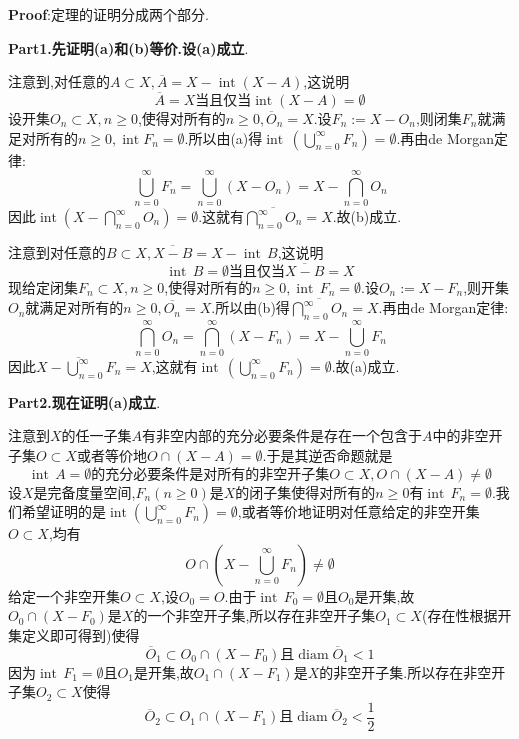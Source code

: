 \textbf{Proof}:定理的证明分成两个部分.\par
\textbf{Part1.先证明(a)和(b)等价.设(a)成立}.\par
注意到,对任意的$A\subset X,\overline{A}=X-\operatorname{int}(X-A)$,这说明
$$
\overline{A}=X\text{当且仅当}\operatorname{int}(X-A)=\emptyset
$$
设开集$O_n\subset X,n\geqslant 0$,使得对所有的$n\geqslant 0,\overline{O}_n=X$.设$F_n:=X-O_n$,则闭集$F_n$就满足对所有的$n\geqslant 0,\operatorname{int}F_n=\emptyset$.所以由(a)得$\operatorname{int}\,\left(\bigcup^{\infty}_{n=0}F_n\right)=\emptyset$.再由de Morgan定律:
$$
\bigcup^{\infty}_{n=0}F_n=\bigcup^{\infty}_{n=0}(X-O_n)=X-\bigcap^{\infty}_{n=0}O_n
$$
因此$\operatorname{int}\left(X-\bigcap^{\infty}_{n=0}O_n\right)=\emptyset$.这就有$\overline{\bigcap^{\infty}_{n=0}O_n}=X$.故(b)成立.\par
注意到对任意的$B\subset X,\overline{X-B}=X-\operatorname{int}\,B$,这说明
$$
\operatorname{int}\,B=\emptyset\text{当且仅当}\overline{X-B}=X
$$
现给定闭集$F_n\subset X,n\geqslant 0$,使得对所有的$n\geqslant 0,\operatorname{int}\,F_n=\emptyset$.设$O_n:=X-F_n$,则开集$O_n$就满足对所有的$n\geqslant 0,\overline{O_n}=X$.所以由(b)得$\overline{\bigcap^{\infty}_{n=0}O_n}=X$.再由de Morgan定律:
$$
\bigcap^{\infty}_{n=0}O_n=\bigcap^{\infty}_{n=0}(X-F_n)=X-\bigcup^{\infty}_{n=0}F_n
$$
因此$\overline{X-\bigcup^{\infty}_{n=0}F_n}=X$,这就有$\operatorname{int}\,\left(\bigcup^{\infty}_{n=0}F_n\right)=\emptyset$.故(a)成立.\par
\textbf{Part2.现在证明(a)成立}.\par
注意到$X$的任一子集$A$有非空内部的充分必要条件是存在一个包含于$A$中的非空开子集$O\subset X$或者等价地$O\cap (X-A)=\emptyset$.于是其逆否命题就是
$$
\operatorname{int}\,A=\emptyset\text{的充分必要条件是对所有的非空开子集}O\subset X,O\cap (X-A)\neq \emptyset
$$
\qquad 设$X$是完备度量空间,$F_n(n\geqslant 0)$是$X$的闭子集使得对所有的$n\geqslant 0$有$\operatorname{int}\, F_n=\emptyset$.我们希望证明的是$\operatorname{int}\left(\bigcup^{\infty}_{n=0}F_n\right)=\emptyset$,或者等价地证明对任意给定的非空开集$O\subset X$,均有
$$
O\cap\left(X-\bigcup^{\infty}_{n=0}F_n\right)\neq \emptyset
$$
\qquad 给定一个非空开集$O\subset X$,设$O_0=O$.由于$\operatorname{int}\,F_0=\emptyset$且$O_0$是开集,故$O_0\cap (X-F_0)$是$X$的一个非空开子集,所以存在非空开子集$O_1\subset X$(存在性根据开集定义即可得到)使得
$$
\overline{O}_1\subset O_0\cap(X-F_0)\text{且}\operatorname{diam}\overline{O}_1<1
$$
因为$\operatorname{int}\,F_1=\emptyset$且$O_1$是开集,故$O_1\cap (X-F_1)$是$X$的非空开子集.所以存在非空开子集$O_2\subset X$使得
$$
\overline{O}_2\subset O_1\cap(X-F_1)\text{且}\operatorname{diam}\overline{O}_2<\frac{1}{2}
$$
